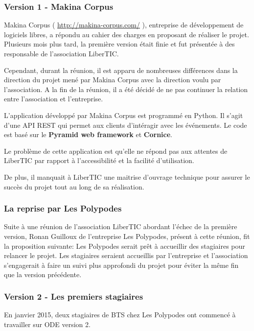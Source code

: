 \subsubsection*{Version 1 - Makina Corpus}

Makina Corpus ( \url{http://makina-corpus.com/} ), entreprise de développement de logiciels libres, a répondu au cahier des charges en proposant de réaliser le projet. Plusieurs mois plus tard, la première version était finie et fut présentée à des responsable de l'association LiberTIC.

Cependant, durant la réunion, il est apparu de nombreuses différences dans la direction du projet mené par Makina Corpus avec la direction voulu par l'association. A la fin de la réunion, il a été décidé de ne pas continuer la relation entre l'association et l'entreprise.

L'application développé par Makina Corpus est programmé en Python. Il s'agit d'une API REST qui permet aux clients d'intéragir avec les événements. Le code est basé sur le \textbf{Pyramid web framework} et \textbf{Cornice}.

Le problème de cette application est qu'elle ne répond pas aux attentes de LiberTIC par rapport à l'accessibilité et la facilité d'utilisation.

De plus, il manquait à LiberTIC une maitrise d'ouvrage technique pour assurer le succès du projet tout au long de sa réalisation.

\subsubsection*{La reprise par Les Polypodes}

Suite à une réunion de l'association LiberTIC abordant l'échec de la première version, Ronan Guilloux de l'entreprise Les Polypodes, présent à cette réunion, fit la proposition suivante: Les Polypodes serait prêt à accueillir des stagiaires pour relancer le projet. Les stagiaires seraient accueillis par l'entreprise et l'association s'engagerait à faire un suivi plus approfondi du projet pour éviter la même fin que la version précédente.

\subsubsection*{Version 2 - Les premiers stagiaires}

En janvier 2015, deux stagiaires de BTS chez Les Polypodes ont commencé à travailler sur ODE version 2.

